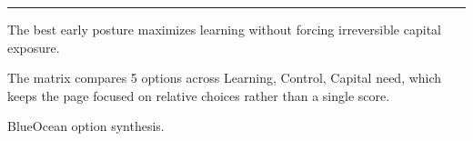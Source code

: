 \documentclass[10pt,a4paper]{article}
\begin{document}
\vspace{3pt}\noindent\begin{minipage}[t]{0.58\linewidth}
\textcolor{BOGreen}{\rule{24mm}{0.6pt}}\par\vspace{3pt}
{\footnotesize\color{BOText} The best early posture maximizes learning without forcing irreversible capital exposure.}\par\vspace{2pt}
{\footnotesize\color{BOText} The matrix compares 5 options across Learning, Control, Capital need, which keeps the page focused on relative choices rather than a single score.}\par\vspace{2pt}
\end{minipage}\hfill\begin{minipage}[t]{0.36\linewidth}
\par
\end{minipage}\par\vspace{2pt}
\par
{\scriptsize\color{BOMuted} BlueOcean option synthesis.}\par
\end{document}
